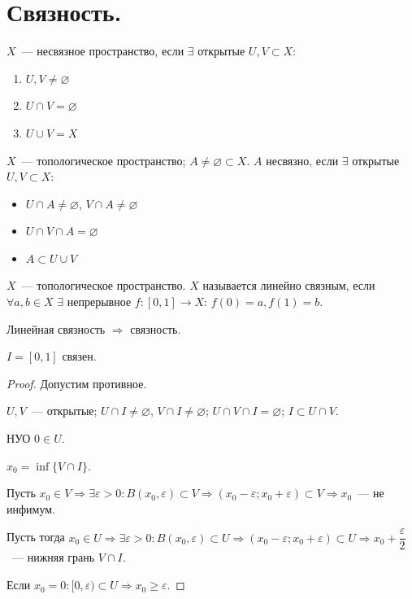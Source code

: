 \documentclass[12pt]{article}
\begin{document}
	\section{Связность.}
	
	\begin{definition}[Несвязность]
		$X$~--- несвязное пространство, если $\exists$ открытые $U, V \subset X$:
		\begin{enumerate}
			\item $U, V \ne \varnothing$
			\item $U \cap V = \varnothing$
			\item $U \cup V = X$
		\end{enumerate}
	\end{definition}
	
	\begin{definition}[Несвязность]
		$X$~--- топологическое пространство; $A \ne \varnothing \subset X$. $A$ несвязно, если $\exists$ открытые $U, V \subset X$:
		\begin{itemize}
			\item $U \cap A \ne \varnothing$, $V \cap A \ne \varnothing$
			\item $U \cap V \cap A = \varnothing$
			\item $A \subset U \cup V$
		\end{itemize}
	\end{definition}
	
	\begin{definition}
		$X$~--- топологическое пространство. $X$ называется линейно связным, если $\forall a, b \in X$  $\exists$ непрерывное $f: [0, 1] \rightarrow X$: $f(0) = a, f(1) = b$.
	\end{definition}
	
	\begin{note}
		Линейная связность $\Rightarrow$ связность.
	\end{note}
	
	\begin{theorem}
		$I = [0, 1]$ связен.
	\end{theorem}
	
	\begin{proof}
		Допустим противное.
		
		$U, V$~--- открытые; $U \cap I \ne \varnothing$, $V \cap I \ne \varnothing$; $U \cap V \cap I = \varnothing$; $I \subset U \cap V$.
		
		НУО $0 \in U$.
		
		$x_0 = \inf \{ V \cap I \}$.
		
		Пусть $x_0 \in V \Rightarrow \exists \varepsilon > 0: B(x_0, \varepsilon) \subset V \Rightarrow (x_0 - \varepsilon; x_0 + \varepsilon) \subset V \Rightarrow x_0$~--- не инфимум.
		
		Пусть тогда $x_0 \in U \Rightarrow \exists \varepsilon > 0: B(x_0, \varepsilon) \subset U \Rightarrow (x_0 - \varepsilon; x_0 + \varepsilon) \subset U \Rightarrow x_0 + \dfrac{\varepsilon}{2}$~--- нижняя грань $V \cap I$.
		
		Если $x_0 = 0: [0, \varepsilon) \subset U \Rightarrow x_0 \geqslant \varepsilon$.
	\end{proof}
	
\end{document}
